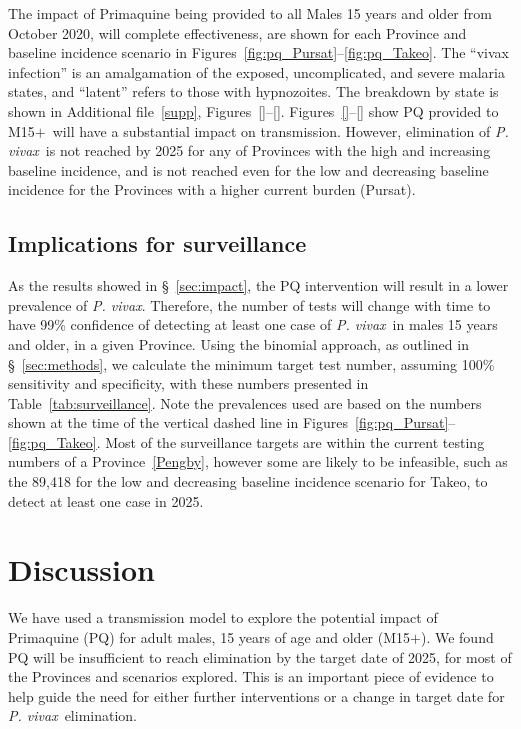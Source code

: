 \documentclass[doublespacing]{bmcart}
\newcommand{\pv}{\textit{P. vivax}}
\newcommand{\males}{M15$+$}
\begin{document}
The impact of Primaquine being provided to all Males 15 years and older from October 2020, will complete effectiveness, are shown for each Province and baseline incidence scenario in Figures~\ref{fig:pq_Pursat}--\ref{fig:pq_Takeo}. The ``vivax infection'' is an amalgamation of the exposed, uncomplicated, and severe malaria states, and ``latent'' refers to those with hypnozoites. The breakdown by state is shown in Additional file~\ref{supp}, Figures~\ref{}--\ref{}. Figures~\ref{}--\ref{} show PQ provided to \males~will have a substantial impact on transmission. However, elimination of \pv~is not reached by 2025 for any of Provinces with the high and increasing baseline incidence, and is not reached even for the low and decreasing baseline incidence for the Provinces with a higher current burden (Pursat). 

\subsection*{Implications for surveillance}

As the results showed in \S~\ref{sec:impact}, the PQ intervention will result in a lower prevalence of \pv. Therefore, the number of tests will change with time to have 99\% confidence of detecting at least one case of \pv~in males 15 years and older, in a given Province. Using the binomial approach, as outlined in \S~\ref{sec:methods}, we calculate the minimum target test number, assuming 100\% sensitivity and specificity, with these numbers presented in Table~\ref{tab:surveillance}. Note the prevalences used are based on the numbers shown at the time of the vertical dashed line in Figures~\ref{fig:pq_Pursat}--\ref{fig:pq_Takeo}. Most of the surveillance targets are within the current testing numbers of a Province~\ref{Pengby}, however some are likely to be infeasible, such as the 89,418 for the low and decreasing baseline incidence scenario for Takeo, to detect at least one case in 2025. 

\section*{Discussion}

We have used a transmission model to explore the potential impact of Primaquine (PQ) for adult males, 15 years of age and older (\males). We found PQ will be insufficient to reach elimination by the target date of 2025, for most of the Provinces and scenarios explored. This is an important piece of evidence to help guide the need for either further interventions or a change in target date for \pv~elimination. 
\end{document}
